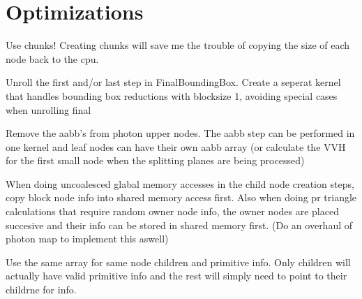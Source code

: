 \chapter{Optimizations}

Use chunks! Creating chunks will save me the trouble of copying the
size of each node back to the cpu.

Unroll the first and/or last step in FinalBoundingBox. Create a
seperat kernel that handles bounding box reductions with blocksize 1,
avoiding special cases when unrolling final

Remove the aabb's from photon upper nodes. The aabb step can be
performed in one kernel and leaf nodes can have their own aabb array
(or calculate the VVH for the first small node when the splitting
planes are being processed)

When doing uncoalesced glabal memory accesses in the child node
creation steps, copy block node info into shared memory access first.
Also when doing pr triangle calculations that require random owner
node info, the owner nodes are placed succesive and their info can be
stored in shared memory first. (Do an overhaul of photon map to
implement this aswell)

Use the same array for same node children and primitive info. Only
children will actually have valid primitive info and the rest will
simply need to point to their childrne for info.
